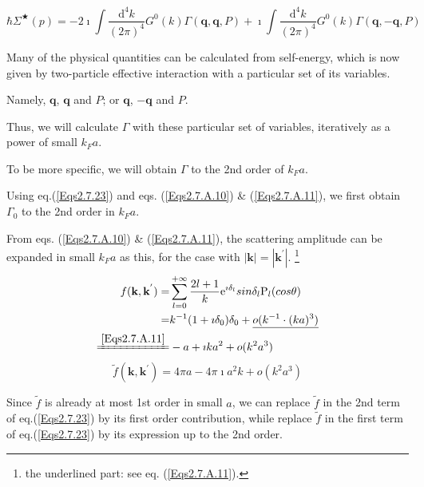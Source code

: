 \begin{equation} \label{Eqs2.7.25}
\hbar \Sigma^{\bigstar}(p) = -2 \imath \int \frac{\mathrm{d}^4 k}{(2\pi)^4} G^0(k)\Gamma(\mathbf{q},\mathbf{q},P) + \imath \int \frac{\mathrm{d}^4 k}{(2\pi)^4} G^0(k)\Gamma(\mathbf{q},-\mathbf{q},P)
\end{equation}

Many of the physical quantities can be calculated from self-energy, which is now given by two-particle effective interaction with a particular set of its variables.

Namely, $\mathbf{q}$, $\mathbf{q}$ and $P$; or $\mathbf{q}$, $-\mathbf{q}$ and $P$.

Thus, we will calculate $\Gamma$ with these particular set of variables, iteratively as a power of small $k_F a$.

To be more specific, we will obtain $\Gamma$ to the 2nd order of $k_F a$.

Using eq.(\ref{Eqs2.7.23}) and eqs. (\ref{Eqs2.7.A.10}) \& (\ref{Eqs2.7.A.11}), we first obtain $\Gamma_0$ to the 2nd order in $k_F a$.

From eqs. (\ref{Eqs2.7.A.10}) \& (\ref{Eqs2.7.A.11}), the scattering amplitude can be expanded in small $k_F a$ as this, for the case with $|\mathbf{k}|=|\mathbf{k}^{'}|$.
\footnote{the underlined part: see eq. (\ref{Eqs2.7.A.11}).}
\[ \begin{split} f(\mathbf{k},\mathbf{k}^{'}) =& \sum_{l=0}^{+\infty} \frac{2l+1}{k} \mathrm{e}^{\imath \delta_l} sin \delta_l \mathrm{P}_l(cos\theta)\\
=& k^{-1} (1+\imath \delta_0) \delta_0 + \underline{o(k^{-1} \cdot (k a)^3)}\\
\xlongequal{\ref{Eqs2.7.A.11}}& -a + \imath k a^2 + o(k^2 a^3)
\end{split} \]
\[ \tilde{f}(\mathbf{k},\mathbf{k}^{'}) = 4\pi a - 4\pi \imath a^2 k + o(k^2 a^3) \]

Since $\tilde{f}$ is already at most 1st order in small $a$, we can replace $\tilde{f}$ in the 2nd term of eq.(\ref{Eqs2.7.23}) by its first order contribution, while replace $\tilde{f}$ in the first term of eq.(\ref{Eqs2.7.23}) by its expression up to the 2nd order.

